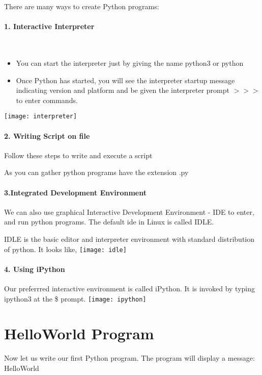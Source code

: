 \documentclass[]{book}
\begin{document}
    There are many ways to create Python programs:
    \paragraph {1. Interactive Interpreter} ~
    \begin{itemize}
        \item You can start the interpreter just by giving the name python3 or python
        \item Once Python has started, you will see the interpreter startup message indicating version and platform and be given the interpreter prompt \emph{$>>>$} to enter commands.
    \end{itemize}
    \texttt{[image: interpreter]}
    \paragraph {2. Writing Script on file} Follow these steps to write and execute a script
    As you can gather python programs have the extension .py
    \paragraph {3.Integrated Development Environment} We can also use graphical Interactive Development Environment - IDE to enter, and run python programs. The default ide in Linux is called IDLE. 
    
    IDLE is the basic editor and interpreter environment with standard distribution of python. It looks like,
    \texttt{[image: idle]}
    \paragraph {4. Using iPython} Our preferrred interactive environment is called iPython. It is invoked by typing ipython3 at the \$ prompt.
    \texttt{[image: ipython]}
    \section*{HelloWorld Program}
    Now let us write our first Python program. The program will display a message: HelloWorld
    
\end{document}
